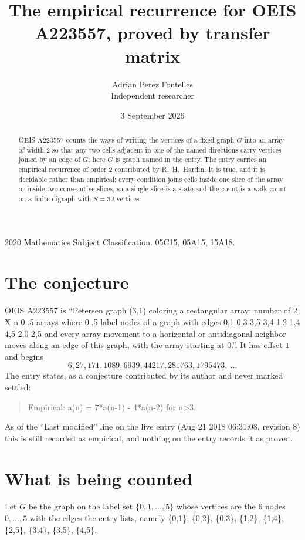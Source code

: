 \documentclass[11pt,a4paper]{article}
\title{The empirical recurrence for OEIS A223557, proved by transfer matrix}
\author{Adrian Perez Fontelles\\ \small Independent researcher}
\date{3 September 2026}
\theoremstyle{plain}
\theoremstyle{definition}
\begin{document}
\maketitle

\begin{abstract}
OEIS A223557 counts the ways of writing the vertices of a fixed graph $G$ into an array of width
$2$ so that any two cells adjacent in one of the named directions carry vertices joined by an
edge of $G$; here $G$ is graph named in the entry. The entry carries an empirical recurrence of order $2$
contributed by R.~H.~Hardin. It is true, and it is decidable rather than empirical: every
condition joins cells inside one slice of the array or inside two consecutive slices, so a
single slice is a state and the count is a walk count on a finite digraph with $S=32$ vertices.
\end{abstract}

\noindent\small 2020 Mathematics Subject Classification. 05C15, 05A15, 15A18.\normalsize

\section{The conjecture}

OEIS A223557 is ``Petersen graph (3,1) coloring a rectangular array: number of 2 X n 0..5 arrays where 0..5 label nodes of a graph with edges 0,1 0,3 3,5 3,4 1,2 1,4 4,5 2,0 2,5 and every array movement to a horizontal or antidiagonal neighbor moves along an edge of this graph, with the array starting at 0.''. It has offset $1$ and begins
\[
6, 27, 171, 1089, 6939, 44217, 281763, 1795473,\ \dots
\]
The entry states, as a conjecture contributed by its author and never marked settled:
\begin{quote}
Empirical: a(n) = 7*a(n-1) - 4*a(n-2) for n>3.
\end{quote}
As of the ``Last modified'' line on the live entry (Aug 21 2018 06:31:08, revision 8) this is still
recorded as empirical, and nothing on the entry records it as proved.

\section{What is being counted}

Let $G$ be the graph on the label set $\{0,1,\dots,5\}$ whose vertices are the $6$ nodes $0,\dots,5$ with the edges the entry lists, namely \{0,1\}, \{0,2\}, \{0,3\}, \{1,2\}, \{1,4\}, \{2,5\}, \{3,4\}, \{3,5\}, \{4,5\}.
\end{document}
